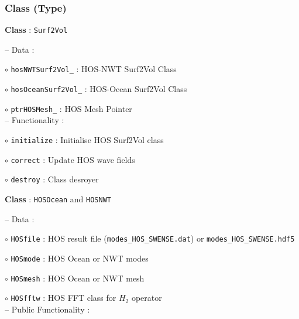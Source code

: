\pagebreak
\subsubsection{Class (Type)}

\textbf{Class} : \texttt{Surf2Vol}

\hspace{0.5 cm} -- Data :

\hspace{1.0 cm} $\circ$ \texttt{hosNWTSurf2Vol\_} : HOS-NWT Surf2Vol Class

\hspace{1.0 cm} $\circ$ \texttt{hosOceanSurf2Vol\_} : HOS-Ocean Surf2Vol Class

\hspace{1.0 cm} $\circ$ \texttt{ptrHOSMesh\_} : HOS Mesh Pointer\\

\hspace{0.5 cm} -- Functionality :

\hspace{1.0 cm} $\circ$ \texttt{initialize} : Initialise HOS Surf2Vol class

\hspace{1.0 cm} $\circ$ \texttt{correct} : Update HOS wave fields

\hspace{1.0 cm} $\circ$ \texttt{destroy} : Class desroyer\\    

\vspace{0.1cm}

\textbf{Class} : \texttt{HOSOcean} and \texttt{HOSNWT}

\hspace{0.5 cm} -- Data :

\hspace{1.0 cm} $\circ$ \texttt{HOSfile} : HOS result file (\texttt{modes\_HOS\_SWENSE.dat}) or \texttt{modes\_HOS\_SWENSE.hdf5}

\hspace{1.0 cm} $\circ$ \texttt{HOSmode} : HOS Ocean or NWT modes

\hspace{1.0 cm} $\circ$ \texttt{HOSmesh} : HOS Ocean or NWT mesh

\hspace{1.0 cm} $\circ$ \texttt{HOSfftw} : HOS FFT class for $H_2$ operator \\

\hspace{0.5 cm} -- Public Functionality :

